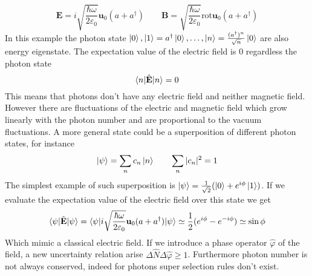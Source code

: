 \documentclass[12pt]{article}
\theoremstyle{plain}
\theoremstyle{definition}
\theoremstyle{remark}
\begin{document}
\[\mathbf{E} = i\sqrt{\frac{\hbar \omega}{2\varepsilon_0}} \mathbf{u}_0(a+a^\dagger)\qquad \mathbf{B} = \sqrt{\frac{\hbar \omega}{2\varepsilon_0}}\text{rot}\mathbf{u}_0(a+a^\dagger) \]
In this example the photon state $\ket{0},\ket{1} = a^\dagger \ket{0},\dots,\ket{n} = \frac{(a^\dagger)^n}{\sqrt{n}}\ket{0}$ are also energy eigenstate. The expectation value of the electric field is 0 regardless the photon state
\[\braket{n|\hat{\mathbf{E}}|n} = 0\]
This means that photons don't have any electric field and neither magnetic field. However there are fluctuations of the electric and magnetic field which grow linearly with the photon number and are proportional to the vacuum fluctuations. A more general state could be a superposition of different photon states, for instance
\[\ket{\psi} = \sum_n c_n \ket{n} \qquad \sum_n |c_n|^2 = 1\]
The simplest example of such superposition is $\ket{\psi} = \frac{1}{\sqrt{2}}(\ket{0} + e^{i\phi} \ket{1})$.  If we evaluate the expectation value of the electric field over this state we get
\[\braket{\psi|\hat{\mathbf{E}}|\psi} = \braket{\psi|i\sqrt{\frac{\hbar \omega}{2\varepsilon_0}} \mathbf{u}_0(a+a^\dagger)|\psi} \simeq \frac{1}{2} (e^{i\phi}-e^{-i\phi}) \simeq \sin\phi \]
Which mimic a classical electric field. If we introduce a phase operator $\hat{\varphi}$ of the field, a new uncertainty relation arise $\Delta \hat{N} \Delta \hat{\varphi} \ge 1$. Furthermore photon number is not always conserved, indeed for photons super selection rules don't exist.
\end{document}

